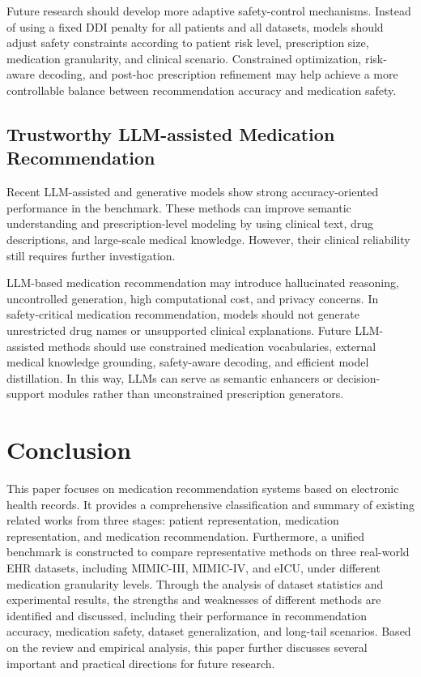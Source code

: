 \documentclass[manuscript,review]{acmart}
\begin{document}
Future research should develop more adaptive safety-control mechanisms. Instead of using a fixed DDI penalty for all patients and all datasets, models should adjust safety constraints according to patient risk level, prescription size, medication granularity, and clinical scenario. Constrained optimization, risk-aware decoding, and post-hoc prescription refinement may help achieve a more controllable balance between recommendation accuracy and medication safety.

\subsection{Trustworthy LLM-assisted Medication Recommendation}

Recent LLM-assisted and generative models show strong accuracy-oriented performance in the benchmark. These methods can improve semantic understanding and prescription-level modeling by using clinical text, drug descriptions, and large-scale medical knowledge. However, their clinical reliability still requires further investigation.

LLM-based medication recommendation may introduce hallucinated reasoning, uncontrolled generation, high computational cost, and privacy concerns. In safety-critical medication recommendation, models should not generate unrestricted drug names or unsupported clinical explanations. Future LLM-assisted methods should use constrained medication vocabularies, external medical knowledge grounding, safety-aware decoding, and efficient model distillation. In this way, LLMs can serve as semantic enhancers or decision-support modules rather than unconstrained prescription generators.


\section{Conclusion}
\label{sec:conclusion}
This paper focuses on medication recommendation systems based on electronic health records. It provides a comprehensive classification and summary of existing related works from three stages: patient representation, medication representation, and medication recommendation. Furthermore, a unified benchmark is constructed to compare representative methods on three real-world EHR datasets, including MIMIC-III, MIMIC-IV, and eICU, under different medication granularity levels. Through the analysis of dataset statistics and experimental results, the strengths and weaknesses of different methods are identified and discussed, including their performance in recommendation accuracy, medication safety, dataset generalization, and long-tail scenarios. Based on the review and empirical analysis, this paper further discusses several important and practical directions for future research.
\end{document}
